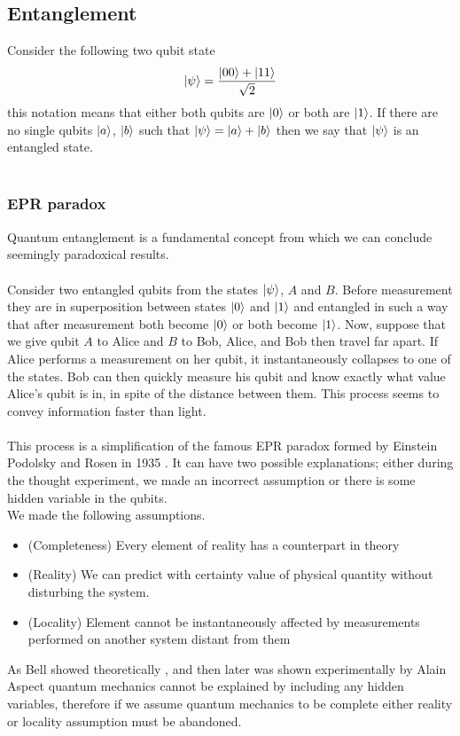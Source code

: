 \subsection{Entanglement}
Consider the following two qubit state
\begin{align}
    \ket{\psi}=\frac{\ket{00}+\ket{11}}{\sqrt{2}}
\end{align}
this notation means that either both qubits are $\ket{0}$ or both are $\ket{1}$.
If there are no single qubits $\ket{a}$, $\ket{b}$ such that $\ket{\psi}=\ket{a}+\ket{b}$ then we say that $\ket{\psi}$ is an entangled state.\\\\
\subsubsection{EPR paradox}
Quantum entanglement is a fundamental concept from which we can conclude seemingly paradoxical results.\\\\
Consider two entangled qubits from the states $\ket{\psi}$, $A$ and $B$. Before measurement they are in superposition between states $\ket{0}$ and $\ket{1}$ and entangled in such a way that after measurement both become $\ket{0}$ or both become $\ket{1}$. Now, suppose that we give qubit $A$ to Alice and $B$ to Bob, Alice, and Bob then travel far apart. If Alice performs a measurement on her qubit, it instantaneously collapses to one of the states. Bob can then quickly measure his qubit and know exactly what value Alice's qubit is in, in spite of the distance between them. This process seems to convey information faster than light.\\\\
This process is a simplification of the famous EPR paradox formed by Einstein Podolsky and Rosen in 1935 \cite{epr}. It can have two possible explanations; either during the thought experiment, we made an incorrect assumption or there is some hidden variable in the qubits.\\
We made the following assumptions.
\begin{itemize}
    \item (Completeness) Every element of reality has a counterpart in theory
    \item (Reality) We can predict with certainty value of physical quantity without disturbing the system.
    \item (Locality) Element cannot be instantaneously affected by measurements performed on another system distant from them
\end{itemize}
As Bell showed theoretically \cite{bell}, and then later was shown experimentally by Alain Aspect \cite{aspect} quantum mechanics cannot be explained by including any hidden variables, therefore if we assume quantum mechanics to be complete either reality or locality assumption must be abandoned. 
